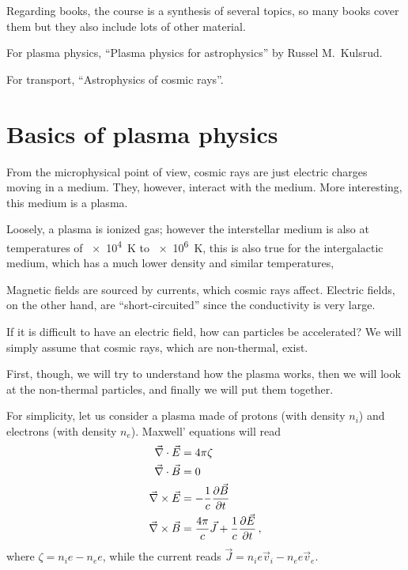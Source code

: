 \documentclass[main.tex]{subfiles}
\begin{document}

Regarding books, the course is a synthesis of several topics, so many books cover them but they also include lots of other material.

For plasma physics, ``Plasma physics for astrophysics'' by Russel M.\ Kulsrud.

For transport, ``Astrophysics of cosmic rays''.

\section{Basics of plasma physics}

From the microphysical point of view, cosmic rays are just electric charges moving in a medium. 
They, however, interact with the medium. 
More interesting, this medium is a plasma. 

Loosely, a plasma is ionized gas; however the interstellar medium is also at temperatures of \SI{e4}{K} to \SI{e6}{K}, this is also true for the intergalactic medium, which has a much lower density and similar temperatures, 


Magnetic fields are sourced by currents, which cosmic rays affect. 
Electric fields, on the other hand, are ``short-circuited'' since the conductivity is very large. 

If it is difficult to have an electric field, how can particles be accelerated? 
We will simply assume that cosmic rays, which are non-thermal, exist. 

First, though, we will try to understand how the plasma works, then we will look at the non-thermal particles, and finally we will put them together.

For simplicity, let us consider a plasma made of protons (with density \(n_i\)) and electrons (with density \(n_e\)). 
Maxwell' equations will read 
%
\begin{subequations}\label{eq:maxwell}
\begin{align}
\vec{\nabla} \cdot \vec{E} &= 4 \pi \zeta  \\
\vec{\nabla} \cdot \vec{B} &= 0  \\
\vec{\nabla} \times \vec{E} &= - \frac{1}{c} \pdv{\vec{B}}{t}  \\
\vec{\nabla} \times \vec{B} &= \frac{4 \pi }{c} \vec{J} + \frac{1}{c} \pdv{\vec{E}}{t}
\,,
\end{align}
\end{subequations}
%
where \(\zeta = n_i e - n_e e\), while the current reads \(\vec{J} = n_i e \vec{v}_i - n_e e \vec{v}_e\). 
\end{document}
